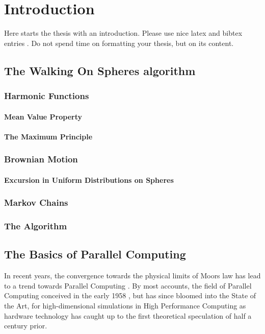 \chapter{Introduction}
\label{chapter:Introduction}



Here starts the thesis with an introduction. Please use nice latex and bibtex entries \cite{Sabelfeld}. Do not spend time on formatting your thesis, but on its content.

\section{The Walking On Spheres algorithm}
\subsection{Harmonic Functions}
\subsubsection{Mean Value Property}
\subsubsection{The Maximum Principle}
\subsection{Brownian Motion}
\subsubsection{Excursion in Uniform Distributions on Spheres}
\subsection{Markov Chains}
\subsection{The Algorithm}



\section{The Basics of Parallel Computing}
In recent years, the convergence towards the physical limits of Moors law has lead to a
trend towards Parallel Computing\cite{Kumar} \cite{Markov}.  By most accounts, the
field of Parallel Computing conceived in the early 1958 \cite{Gill}, but has
since bloomed into the State of the Art, for high-dimensional simulations in
High Performance Computing as hardware technology has caught up to the first
theoretical speculation of half a century prior. \par

